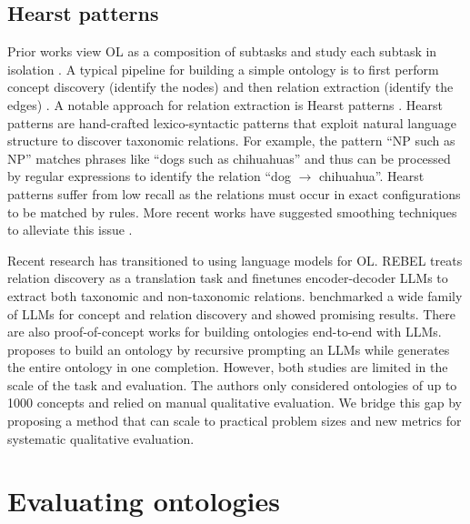 \subsection{Hearst patterns}  \label{sec:hearst}

Prior works view OL as a composition of subtasks and study each subtask in isolation \cite{buitelaar2005ontology,asim2018survey}. A typical pipeline for building a simple ontology is to first perform concept discovery (identify the nodes) and then relation extraction (identify the edges) \cite{cimiano2005text2onto,kaushik2018automatic}. A notable approach for relation extraction is Hearst patterns \cite{hearst1998automated}. Hearst patterns are hand-crafted lexico-syntactic patterns that exploit natural language structure to discover taxonomic relations. For example, the pattern ``NP such as NP'' matches phrases like ``dogs such as chihuahuas'' and thus can be processed by regular expressions to identify the relation ``dog $\to$ chihuahua''. Hearst patterns suffer from low recall as the relations must occur in exact configurations to be matched by rules. More recent works have suggested smoothing techniques to alleviate this issue \cite{roller2018hearst}.

Recent research has transitioned to using language models for OL. REBEL \cite{cabot2021rebel} treats relation discovery as a translation task and finetunes encoder-decoder LLMs to extract both taxonomic and non-taxonomic relations. \citet{babaei2023llms4ol} benchmarked a wide family of LLMs for concept and relation discovery and showed promising results. There are also proof-of-concept works for building ontologies end-to-end with LLMs. \citet{funk2023towards} proposes to build an ontology by recursive prompting an LLMs while \citet{trajanoska2023enhancing} generates the entire ontology in one completion. However, both studies are limited in the scale of the task and evaluation. The authors only considered ontologies of up to 1000 concepts and relied on manual qualitative evaluation. We bridge this gap by proposing a method that can scale to practical problem sizes and new metrics for systematic qualitative evaluation.

\section{Evaluating ontologies}

